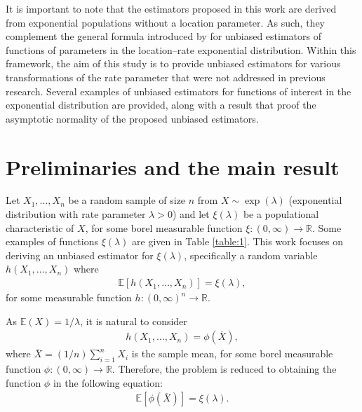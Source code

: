 \documentclass[12pt]{article}
\theoremstyle{definition}
\begin{document}
{\color{black}
It is important to note that the estimators proposed in this work are derived from exponential populations without a location parameter. As such, they complement the general formula introduced by \cite{Tate1959} for unbiased estimators of functions of parameters in the location–rate exponential distribution. Within this framework, the aim of this study is to provide unbiased estimators for various transformations of the rate parameter that were not addressed in previous research.
}
%
%
Several examples of unbiased estimators for functions of interest in the exponential distribution are provided, along with a result that proof the asymptotic normality of the proposed unbiased estimators.







\section{Preliminaries and the main result}

Let $X_1,\ldots, X_n$ be a random sample of size $n$ from $X\sim\exp(\lambda)$ (exponential distribution with rate parameter $\lambda>0$) and let $\xi(\lambda)$ be a populational characteristic of $X$, for some borel measurable function $\xi:(0,\infty)\to\mathbb{R}$. 
Some examples of functions $\xi(\lambda)$ are given in Table \ref{table:1}. This work focuses on deriving an unbiased estimator for $\xi(\lambda)$, specifically a random variable $h(X_1,\ldots,X_n)$ where
\begin{align*}
	\mathbb{E}\left[h(X_1,\ldots,X_n)\right]
	=
	\xi(\lambda),
\end{align*}
for some measurable function $h:(0,\infty)^n\to\mathbb{R}$.


As $\mathbb{E}(X)=1/\lambda$, it is natural to consider
\begin{align*}
	h(X_1,\ldots,X_n)=\phi(\overline{X}),
\end{align*}
where $\overline{X}=(1/n)\sum_{i=1}^{n}X_i$ is the sample mean, for some borel measurable function $\phi:(0,\infty)\to\mathbb{R}$. Therefore, the problem is reduced to obtaining the function $\phi$ in the following equation:
\begin{align}\label{eq-1}
	\mathbb{E}\left[\phi(\overline{X})\right]
	=
	\xi(\lambda).
\end{align}
\end{document}
